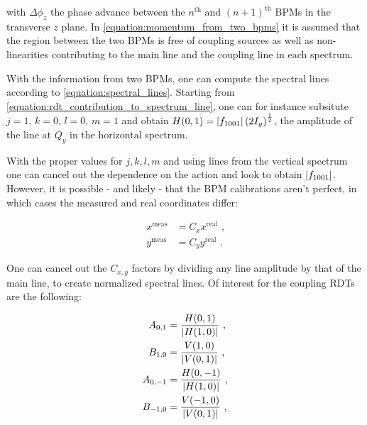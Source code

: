 \noindent
with \(\Delta \phi_z\) the phase advance between the \(n^{\mathrm{th}}\) and \((n+1)^{\mathrm{th}}\) BPMs in the transverse \(z\) plane.
In \cref{equation:momentum_from_two_bpms} it is assumed that the region between the two BPMs is free of coupling sources as well as non-linearities contributing to the main line and the coupling line in each spectrum.

With the information from two BPMs, one can compute the spectral lines according to \cref{equation:spectral_lines}.
Starting from \cref{equation:rdt_contribution_to_spectrum_line}, one can for instance subsitute \(j = 1\), \(k = 0\), \(l = 0\), \(m = 1\) and obtain \(H(0, 1) = \left\lvert f_{1001} \right\rvert \left(2 I_y \right)^{\frac{1}{2}}\), the amplitude of the line at \(Q_y\) in the horizontal spectrum.

With the proper values for \(j,k,l,m\) and using lines from the vertical spectrum one can cancel out the dependence on the action and look to obtain \(\left\lvert f_{1001} \right\rvert\).
However, it is possible - and likely - that the BPM calibrations aren't perfect, in which cases the measured and real coordinates differ:

\begin{equation}
  \begin{aligned}
    x^{\mathrm{meas}} &= C_x x^{\mathrm{real}}  \text{ ,}  \\
    y^{\mathrm{meas}} &= C_y y^{\mathrm{real}}  \text{ .}
  \end{aligned}
\end{equation}
\vspace{1pt}

One can cancel out the \(C_{x,y}\) factors by dividing any line amplitude by that of the main line, to create normalized spectral lines.
Of interest for the coupling \glspl{RDT} are the following:

\begin{equation}
  \begin{aligned}
    A_{0,1} &= \frac{H(0,1)}{\left\lvert H(1,0) \right\rvert}    \text{ ,}  \\
    B_{1,0} &= \frac{V(1,0)}{\left\lvert V(0,1) \right\rvert}    \text{ ,}  \\
    A_{0,-1} &= \frac{H(0,-1)}{\left\lvert H(1,0) \right\rvert}  \text{ ,}  \\
    B_{-1,0} &= \frac{V(-1,0)}{\left\lvert V(0,1) \right\rvert}  \text{ ,}
  \end{aligned}
  \label{equation:normalized_spectral_lines}
\end{equation}
\vspace{1pt}

